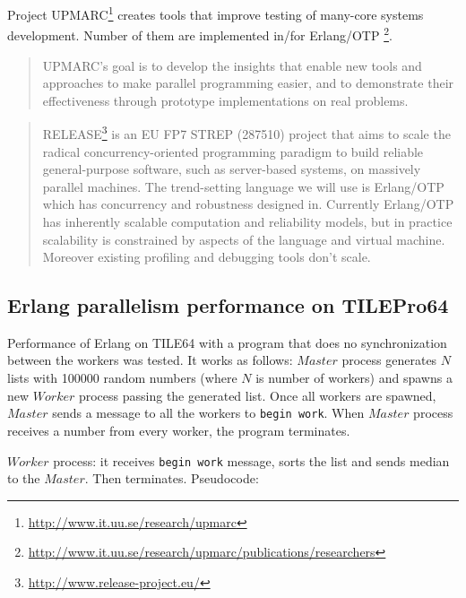 \documentclass[english,11pt]{l4proj}
\begin{document}
Project UPMARC\footnote{\url{http://www.it.uu.se/research/upmarc}} creates tools
that improve testing of many-core systems development. Number of them are
implemented in/for
Erlang/OTP
\footnote{\url{http://www.it.uu.se/research/upmarc/publications/researchers}}.

\begin{quote}
UPMARC's goal is to develop the insights that enable new tools and approaches to
make parallel programming easier, and to demonstrate their effectiveness through
prototype implementations on real problems.
\end{quote}

\begin{quote}
RELEASE\footnote{\url{http://www.release-project.eu/}} is an EU FP7 STREP
(287510) project that aims to scale the radical concurrency-oriented programming
paradigm to build reliable general-purpose software, such as server-based
systems, on massively parallel machines. The trend-setting language we will use
is Erlang/OTP which has concurrency and robustness designed in. Currently
Erlang/OTP has inherently scalable computation and reliability models, but in
practice scalability is constrained by aspects of the language and virtual
machine. Moreover existing profiling and debugging tools don't scale.
\end{quote}

\subsection{Erlang parallelism performance on TILEPro64}

Performance of Erlang on TILE64 with a program that does no synchronization
between the workers was tested. It works as follows: $Master$ process generates
$N$ lists with 100000 random numbers (where $N$ is number of workers) and spawns
a new $Worker$ process passing the generated list. Once all workers are spawned,
$Master$ sends a message to all the workers to {\tt begin work}. When $Master$
process receives a number from every worker, the program terminates.

$Worker$ process: it receives {\tt begin work} message, sorts the list and
sends median to the $Master$. Then terminates. Pseudocode:
\end{document}
